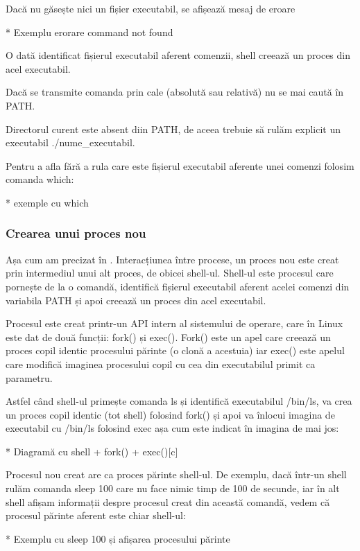 Dacă nu găsește nici un fișier executabil, se afișează mesaj de eroare

* Exemplu erorare command not found

O dată identificat fișierul executabil aferent comenzii, shell creează un proces
din acel executabil.

Dacă se transmite comanda prin cale (absolută sau relativă) nu se mai caută în
PATH.

Directorul curent este absent diin PATH, de aceea trebuie să rulăm explicit un
executabil ./nume_executabil.

Pentru a afla fără a rula care este fișierul executabil aferente unei comenzi
folosim comanda which:

* exemple cu which

\subsubsection{Crearea unui proces nou}
\label{sec:cli-new-process}

Așa cum am precizat în .
Interacțiunea între procese, un proces nou este creat prin intermediul unui alt
proces, de obicei shell-ul. Shell-ul este procesul care pornește de la o
comandă, identifică fișierul executabil aferent acelei comenzi din variabila
PATH și apoi creează un proces din acel executabil.

Procesul este creat printr-un API intern al sistemului de operare, care în Linux
este dat de două funcții: fork() și exec(). Fork() este un apel care creează un
proces copil identic procesului părinte (o clonă a acestuia) iar exec() este
apelul care modifică imaginea procesului copil cu cea din executabilul primit ca
parametru.

Astfel când shell-ul primește comanda ls și identifică executabilul /bin/ls, va
crea un proces copil identic (tot shell) folosind fork() și apoi va înlocui
imagina de executabil cu /bin/ls folosind exec așa cum este indicat în imagina
de mai jos:

* Diagramă cu shell + fork() + exec()[c]

Procesul nou creat are ca proces părinte shell-ul. De exemplu, dacă într-un
shell rulăm comanda sleep 100 care nu face nimic timp de 100 de secunde, iar în
alt shell afișam informații despre procesul creat din această comandă, vedem că
procesul părinte aferent este chiar shell-ul:

* Exemplu cu sleep 100 și afișarea procesului părinte

